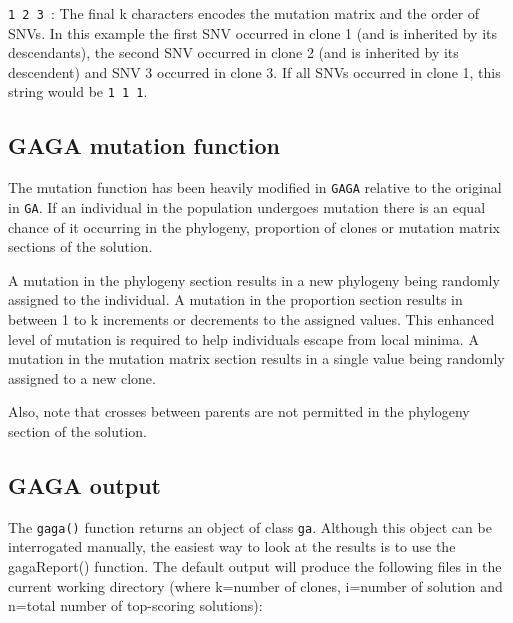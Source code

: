 \documentclass{article}
\begin{document}
\newline
\newline
{\raggedright{}\texttt{{\color{icrorange}1   2   3 }}: The final {\color{icrred}k} characters encodes the mutation matrix and the order of SNVs. In this example the first SNV occurred in clone 1 (and is inherited by its descendants), the second SNV occurred in clone 2 (and is inherited by its descendent) and SNV 3 occurred in clone 3.  If all SNVs occurred in clone 1, this string would be \texttt{1 1 1}.}

\subsection{GAGA mutation function}
The mutation function has been heavily modified in \texttt{GAGA} relative to the original in \texttt{GA}.  If an individual in the
population undergoes mutation there is an equal chance of it occurring in the phylogeny, proportion of clones or mutation matrix 
sections of the solution.

A mutation in the phylogeny section results in a new phylogeny being randomly assigned to the individual. A mutation in the proportion
section results in between 1 to {\color{icrred}k} increments or decrements to the assigned values.  This enhanced level of mutation
is required to help individuals escape from local minima.  A mutation in the mutation matrix section results in a single value being randomly assigned to a new clone.

Also, note that crosses between parents are not permitted in the phylogeny section of the solution.

\subsection{GAGA output}
The \texttt{gaga()} function returns an object of class \texttt{ga}.  Although this object can be interrogated manually, the easiest way to look at the results is to use the gagaReport() function.  The default output will produce the following files in the current working directory (where {\color{icrred}k}=number of clones, {\color{icrred}i}=number of solution and {\color{icrred}n}=total number of top-scoring solutions):
\end{document}
